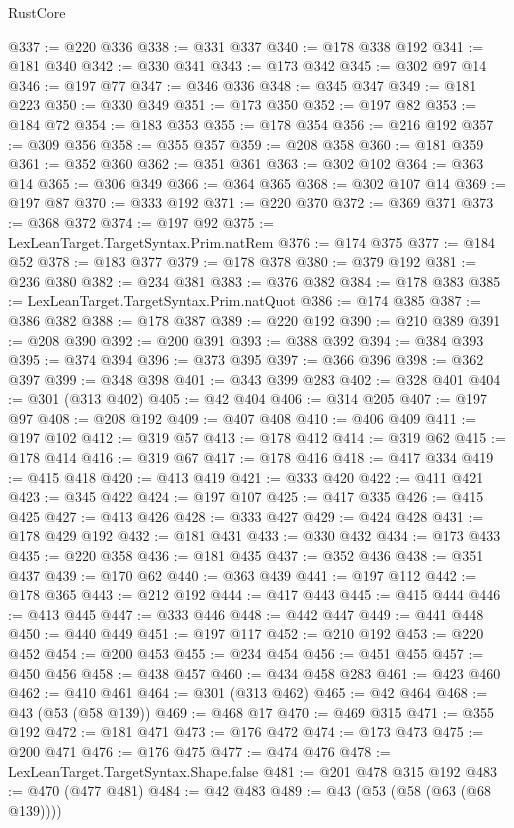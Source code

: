 \begin{lexlean}{RustCore}
\begin{coremodule}
@337 := @220 @336
@338 := @331 @337
@340 := @178 @338 @192
@341 := @181 @340
@342 := @330 @341
@343 := @173 @342
@345 := @302 @97 @14
@346 := @197 @77
@347 := @346 @336
@348 := @345 @347
@349 := @181 @223
@350 := @330 @349
@351 := @173 @350
@352 := @197 @82
@353 := @184 @72
@354 := @183 @353
@355 := @178 @354
@356 := @216 @192
@357 := @309 @356
@358 := @355 @357
@359 := @208 @358
@360 := @181 @359
@361 := @352 @360
@362 := @351 @361
@363 := @302 @102
@364 := @363 @14
@365 := @306 @349
@366 := @364 @365
@368 := @302 @107 @14
@369 := @197 @87
@370 := @333 @192
@371 := @220 @370
@372 := @369 @371
@373 := @368 @372
@374 := @197 @92
@375 := LexLeanTarget.TargetSyntax.Prim.natRem
@376 := @174 @375
@377 := @184 @52
@378 := @183 @377
@379 := @178 @378
@380 := @379 @192
@381 := @236 @380
@382 := @234 @381
@383 := @376 @382
@384 := @178 @383
@385 := LexLeanTarget.TargetSyntax.Prim.natQuot
@386 := @174 @385
@387 := @386 @382
@388 := @178 @387
@389 := @220 @192
@390 := @210 @389
@391 := @208 @390
@392 := @200 @391
@393 := @388 @392
@394 := @384 @393
@395 := @374 @394
@396 := @373 @395
@397 := @366 @396
@398 := @362 @397
@399 := @348 @398
@401 := @343 @399 @283
@402 := @328 @401
@404 := @301 (@313 @402)
@405 := @42 @404
@406 := @314 @205
@407 := @197 @97
@408 := @208 @192
@409 := @407 @408
@410 := @406 @409
@411 := @197 @102
@412 := @319 @57
@413 := @178 @412
@414 := @319 @62
@415 := @178 @414
@416 := @319 @67
@417 := @178 @416
@418 := @417 @334
@419 := @415 @418
@420 := @413 @419
@421 := @333 @420
@422 := @411 @421
@423 := @345 @422
@424 := @197 @107
@425 := @417 @335
@426 := @415 @425
@427 := @413 @426
@428 := @333 @427
@429 := @424 @428
@431 := @178 @429 @192
@432 := @181 @431
@433 := @330 @432
@434 := @173 @433
@435 := @220 @358
@436 := @181 @435
@437 := @352 @436
@438 := @351 @437
@439 := @170 @62
@440 := @363 @439
@441 := @197 @112
@442 := @178 @365
@443 := @212 @192
@444 := @417 @443
@445 := @415 @444
@446 := @413 @445
@447 := @333 @446
@448 := @442 @447
@449 := @441 @448
@450 := @440 @449
@451 := @197 @117
@452 := @210 @192
@453 := @220 @452
@454 := @200 @453
@455 := @234 @454
@456 := @451 @455
@457 := @450 @456
@458 := @438 @457
@460 := @434 @458 @283
@461 := @423 @460
@462 := @410 @461
@464 := @301 (@313 @462)
@465 := @42 @464
@468 := @43 (@53 (@58 @139))
@469 := @468 @17
@470 := @469 @315
@471 := @355 @192
@472 := @181 @471
@473 := @176 @472
@474 := @173 @473
@475 := @200 @471
@476 := @176 @475
@477 := @474 @476
@478 := LexLeanTarget.TargetSyntax.Shape.false
@481 := @201 @478 @315 @192
@483 := @470 (@477 @481)
@484 := @42 @483
@489 := @43 (@53 (@58 (@63 (@68 @139))))

\end{coremodule}
\end{lexlean}
